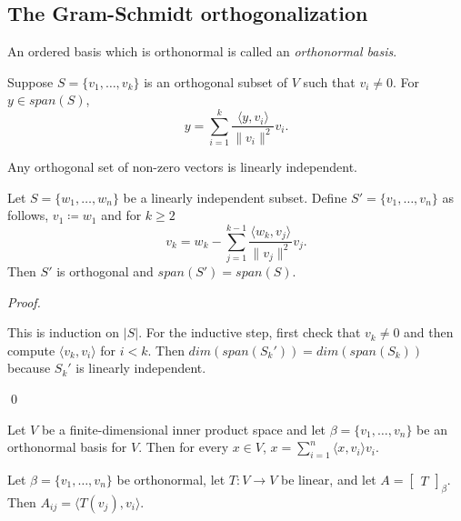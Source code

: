 \documentclass[12pt]{article}
\newenvironment{theorem}[2][Theorem]{\begin{trivlist}
\item[\hskip \labelsep {\bfseries #1}\hskip \labelsep {\bfseries #2.}]}{\end{trivlist}}
\newenvironment{corollary}[2][Corollary]{\begin{trivlist}
\item[\hskip \labelsep {\bfseries #1}\hskip \labelsep {\bfseries #2}]}{\end{trivlist}}
\newenvironment{definition}[2][Definition]{\begin{trivlist}
\item[\hskip \labelsep {\bfseries #1}\hskip \labelsep {\bfseries #2}]}{\end{trivlist}}
\newenvironment{sol}
    {\emph{Proof.}
    }
    {
    \qed
    }
\begin{document}
\subsection{The Gram-Schmidt orthogonalization}

\begin{definition}{5}
An ordered basis which is orthonormal is called an \textit{orthonormal basis}.
\end{definition}

\begin{theorem}{6.3}
Suppose $S = \{v_1, \dots, v_k\}$ is an orthogonal subset of $V$ such that $v_i \neq 0$. For $y \in span(S)$, $$y = \sum_{i = 1}^k\frac{\langle y, v_i \rangle}{\lVert v_i \rVert^2}v_i.$$
\end{theorem}

\begin{corollary}{4}
Any orthogonal set of non-zero vectors is linearly independent.
\end{corollary}

\begin{theorem}{6.4 (Graham-Schmidt algorithm)} Let $S = \{w_1, \dots, w_n\}$ be a linearly independent subset. Define $S' = \{v_1, \dots, v_n\}$ as follows, $v_1 \coloneqq w_1$ and for $k \geq 2$ $$v_k = w_k - \sum_{j = 1}^{k-1}\frac{\langle w_k, v_j \rangle}{\lVert v_j \rVert^2}v_j.$$ Then $S'$ is orthogonal and $span(S') = span(S)$.
\end{theorem}

\begin{sol}
This is induction on $\lvert S \rvert$. For the inductive step, first check that $v_k \neq 0$ and then compute $\langle v_k, v_i \rangle$ for $i < k$. Then $dim(span(S_k')) = dim(span(S_k))$ because $S_k'$ is linearly independent. 
\end{sol}

\begin{theorem}{6.5}
Let $V$ be a finite-dimensional inner product space and let $\beta = \{v_1, \dots, v_n\}$ be an orthonormal basis for $V$. Then for every $x \in V$, $x = \sum_{i = 1}^n \langle x, v_i \rangle v_i$.
\end{theorem}

\begin{corollary}{7}
Let $\beta = \{v_1, \dots, v_n\}$ be orthonormal, let $T : V \to V$ be linear, and let $A = \begin{bmatrix}
T
\end{bmatrix}_\beta$. Then $A_{ij} = \langle T(v_j), v_i \rangle$. 
\end{corollary}
\end{document}
